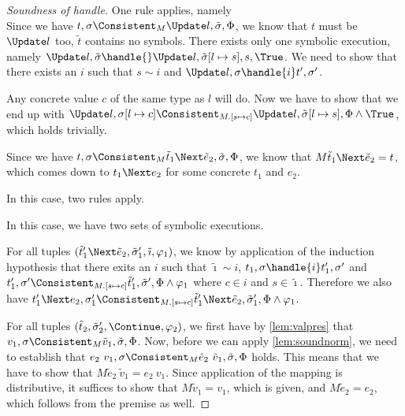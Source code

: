 \begin{proof}[Soundness of handle]
{One rule applies, namely \\

Since we have $t,\sigma\Consistent_M\Update l,\tilde{\sigma},\Phi$, we know that $t$ must be $\Update l$ too, $\tilde{t}$ contains no symbols.
There exists only one symbolic execution, namely $\Update l,\tilde{\sigma}\handle{}\Update l,\tilde{\sigma}[l\mapsto s],s,\True$.
We need to show that there exists an $i$ such that $s\sim i$ and $\Update l,\sigma\handle{i}t',\sigma'$.

Any concrete value $c$ of the same type as $l$ will do. Now we have to show that we end up with $\Update l,\sigma[l\mapsto c]\Consistent_{M.[s\mapsto c]}\Update l,\tilde{\sigma}[l\mapsto s],\Phi\land\True$, which holds trivially.
}


 {
Since we have $t,\sigma\Consistent_M\tilde{t}_1\Next \tilde{e}_2,\tilde{\sigma},\Phi$, we know that $M \tilde{t}_1\Next \tilde{e}_2=t$, which comes down to $t_1\Next e_2$ for some concrete $t_1$ and $e_2$.

 In this case, two rules apply.\\


{
In this case, we have two sets of symbolic executions.

For all tuples $(\tilde{t}_1'\Next \tilde{e}_2,\tilde{\sigma}_1',\tilde{\imath},\phi_1)$, we know by application of the induction hypothesis that
there exits an $i$ such that $\tilde{\imath}\sim i$, $t_1,\sigma\handle{i}t_1',\sigma'$ and
$t_1',\sigma'\Consistent_{M.[s\mapsto c]}\tilde{t}_1',\tilde{\sigma}',\Phi\land\phi_1$ where $c\in i$ and $s\in \tilde{\imath}$.
Therefore we also have $t_1'\Next e_2,\sigma_1'\Consistent_{M.[s\mapsto c]}\tilde{t}_1'\Next \tilde{e}_2,\tilde{\sigma}_1',\Phi\land\phi_1$.

For all tuples $(\tilde{t}_2,\tilde{\sigma}_2',\Continue,\phi_2)$, we first have by \cref{lem:valpres} that
$v_1,\sigma\Consistent_M\tilde{v}_1,\tilde{\sigma},\Phi$.
Now, before we can apply \cref{lem:soundnorm}, we need to establish that
$e_2\ v_1,\sigma\Consistent_M\tilde{e}_2\ \tilde{v}_1,\tilde{\sigma},\Phi$ holds.
This means that we have to show that $M \tilde{e}_2\ \tilde{v}_1 = e_2\ v_1$.
Since application of the mapping is distributive, it suffices to show that $M\tilde{v}_1=v_1$, which is given,
and $M\tilde{e}_2=e_2$, which follows from the premise as well.

}}
\end{proof}
